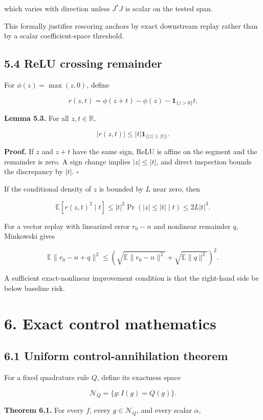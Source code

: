 \documentclass[
  10pt,
]{article}
\begin{document}
which varies with direction unless \(J^*J\) is scalar on the tested
span.

This formally justifies rescoring anchors by exact downstream replay
rather than by a scalar coefficient-space threshold.

\subsection{5.4 ReLU crossing remainder}\label{relu-crossing-remainder}

For \(\phi(z)=\max(z,0)\), define

\[
r(z,t)=\phi(z+t)-\phi(z)-\mathbf 1_{\{z>0\}}t.
\]

\textbf{Lemma 5.3.} For all \(z,t\in\mathbb R\),

\[
|r(z,t)|
\le
|t|\mathbf 1_{\{|z|\le|t|\}}.
\]

\textbf{Proof.} If \(z\) and \(z+t\) have the same sign, ReLU is affine
on the segment and the remainder is zero. A sign change implies
\(|z|\le|t|\), and direct inspection bounds the discrepancy by \(|t|\).
\(\square\)

If the conditional density of \(z\) is bounded by \(L\) near zero, then

\[
\mathbb E[r(z,t)^2\mid t]
\le
|t|^2\Pr(|z|\le|t|\mid t)
\le
2L|t|^3.
\]

For a vector replay with linearized error \(r_0-n\) and nonlinear
remainder \(q\), Minkowski gives

\[
\mathbb E\|r_0-n+q\|^2
\le
\left(
\sqrt{\mathbb E\|r_0-n\|^2}
+
\sqrt{\mathbb E\|q\|^2}
\right)^2.
\]

A sufficient exact-nonlinear improvement condition is that the
right-hand side be below baseline risk.

\section{6. Exact control mathematics}\label{exact-control-mathematics}

\subsection{6.1 Uniform control-annihilation
theorem}\label{uniform-control-annihilation-theorem}

For a fixed quadrature rule \(Q\), define its exactness space

\[
\mathcal N_Q=\{g:I(g)=Q(g)\}.
\]

\textbf{Theorem 6.1.} For every \(f\), every \(g\in\mathcal N_Q\), and
every scalar \(\alpha\),
\end{document}
